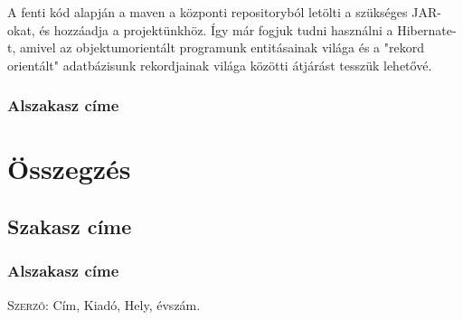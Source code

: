 \documentclass[centeredchapter]{thesis-ekf}
\theoremstyle{definition}
\theoremstyle{remark}
\begin{document}



A fenti kód alapján a maven a központi repositoryból letölti a szükséges JAR-okat, és hozzáadja a projektünkhöz. Így már fogjuk tudni használni a Hibernate-t, amivel az objektumorientált programunk entitásainak világa és a "rekord orientált" adatbázisunk rekordjainak világa közötti átjárást tesszük lehetővé.

\subsection{Alszakasz címe}

\chapter{Összegzés}

\section{Szakasz címe}

\subsection{Alszakasz címe}


\begin{thebibliography}{1}
 \textsc{Szerző}: Cím, Kiadó, Hely, évszám.
\end{thebibliography}
\end{document}
